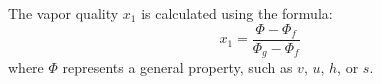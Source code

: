 The vapor quality \( x_1 \) is calculated using the formula:  
\[
x_1 = \frac{\Phi - \Phi_f}{\Phi_g - \Phi_f}
\]  
where \( \Phi \) represents a general property, such as \( v \), \( u \), \( h \), or \( s \).
